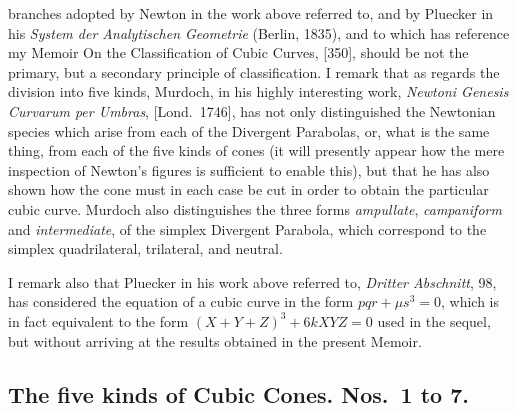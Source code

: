 \documentclass[11pt,a4paper]{article}
\theoremstyle{plain}
\begin{document}
branches adopted by Newton in the work above referred to, and by Pluecker in his \textit{System der Analytischen Geometrie} (Berlin, 1835), and to which has reference my Memoir On the Classification of Cubic Curves, [350], should be not the primary, but a secondary principle of classification. I remark that as regards the division into five kinds, Murdoch, in his highly interesting work, \textit{Newtoni Genesis Curvarum per Umbras}, [Lond.~1746], has not only distinguished the Newtonian species which arise from each of the Divergent Parabolas, or, what is the same thing, from each of the five kinds of cones (it will presently appear how the mere inspection of Newton's figures is sufficient to enable this), but that he has also shown how the cone must in each case be cut in order to obtain the particular cubic curve. Murdoch also distinguishes the three forms \textit{ampullate}, \textit{campaniform} and \textit{intermediate}, of the simplex Divergent Parabola, which correspond to the simplex quadrilateral, trilateral, and neutral.

I remark also that Pluecker in his work above referred to, \textit{Dritter Abschnitt}, 98, has considered the equation of a cubic curve in the form $pqr + \mu s^3 = 0$, which is in fact equivalent to the form $(X+Y+Z)^3 + 6kXYZ = 0$ used in the sequel, but without arriving at the results obtained in the present Memoir.

\subsection*{The five kinds of Cubic Cones. Nos.\ 1 to 7.}
\end{document}
